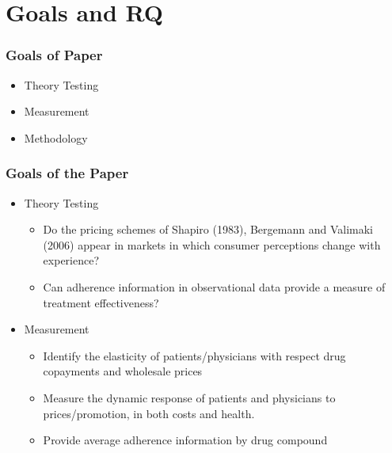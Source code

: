 
\section{Goals and RQ}


\begin{frame}
\frametitle{Goals of Paper}

\begin{itemize}
\item Theory Testing

\item Measurement

\item Methodology
\end{itemize}
\end{frame}


\begin{frame}
\frametitle{Goals of the Paper}

\begin{itemize}
\item Theory Testing

\begin{itemize}
\item Do the pricing schemes of Shapiro (1983), Bergemann and Valimaki
(2006) appear in markets in which consumer perceptions change with
experience?

\item Can adherence information in observational data provide a measure of
treatment effectiveness?
\end{itemize}

\item Measurement

\begin{itemize}
\item Identify the elasticity of patients/physicians with respect drug
copayments and wholesale prices

\item Measure the dynamic response of patients and physicians to
prices/promotion, in both costs and health.

\item Provide average adherence information by drug compound
\end{itemize}
\end{itemize}
\end{frame}

